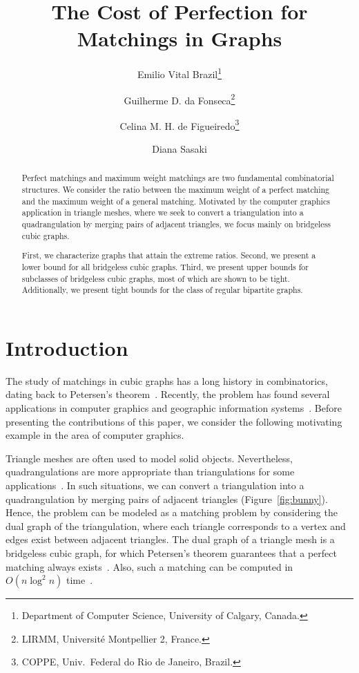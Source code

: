 \documentclass{article}
\title{The Cost of Perfection for Matchings in Graphs}
\author{
Emilio Vital Brazil\thanks{Department of Computer Science, University of Calgary, Canada.}
\and
Guilherme D. da Fonseca\thanks{LIRMM, Universit\'e Montpellier 2, France.}
\and
Celina M. H. de Figueiredo\thanks{COPPE, Univ.~Federal do Rio de Janeiro, Brazil.}
\and
Diana Sasaki\footnotemark[3]
}
\begin{document}
\maketitle

\begin{abstract}
Perfect matchings and maximum weight matchings are two fundamental combinatorial structures. 
We consider the ratio between the maximum weight of a perfect matching and the maximum weight of a general matching. 
Motivated by the computer graphics application in triangle meshes, where we seek to convert a triangulation into a quadrangulation by merging pairs of adjacent triangles, we focus mainly on bridgeless cubic graphs.
	
First, we characterize graphs that attain the extreme ratios. 
Second, we present a lower bound for all bridgeless cubic graphs.
Third, we present upper bounds for subclasses of bridgeless cubic graphs, most of which are shown to be tight.
Additionally, we present tight bounds for the class of regular bipartite graphs.
\end{abstract}


\section{Introduction}
\label{Introduction}
The study of matchings in cubic graphs has a long history in combinatorics, dating back to Petersen's theorem~\cite{konig}. 
Recently, the problem has found several applications in computer graphics and geographic information systems~\cite{biedl01,gopi04,remacle11,daniels11}.
Before presenting the contributions of this paper, we consider the following motivating example in the area of computer graphics.

Triangle meshes are often used to model solid objects. 
Nevertheless, quadrangulations are more appropriate than triangulations for some applications~\cite{daniels11, tri2quad}. 
In such situations, we can convert a triangulation into a quadrangulation by merging pairs of adjacent triangles (Figure~\ref{fig:bunny}). 
Hence, the problem can be modeled as a matching problem by considering the dual graph of the triangulation, where each triangle corresponds to a vertex and edges exist between adjacent triangles. 
The dual graph of a triangle mesh is a bridgeless cubic graph, for which Petersen's theorem guarantees that a perfect matching always exists~\cite{biedl01,bm}. 
Also, such a matching can be computed in $O(n \log^2 n)$ time~\cite{diks10}.
\end{document}
